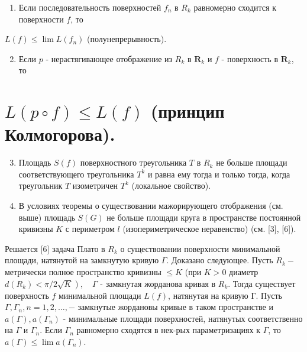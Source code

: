 \documentclass[10pt]{article}
\begin{document}
\begin{enumerate}

  \item Если последовательность поверхностей $f_{n}$ в $R_{k}$ равномерно сходится к поверхности $f$, то

\end{enumerate}



$L(f) \leqslant \lim L\left(f_{n}\right)$ (полунепрерывность).



\begin{enumerate}

  \setcounter{enumi}{1}

  \item Если $p$ - нерастягивающее отображение из $R_{k}$ в $\boldsymbol{R}_{k}$ и $f$ - поверхность в $\boldsymbol{R}_{k}$, то

\end{enumerate}



\section{$L(p \circ f) \leqslant L(f)$ (принцип Колмогорова).}

\begin{enumerate}

  \setcounter{enumi}{2}

  \item Площадь $S(f)$ поверхностного треугольника $T$ в $R_{k}$ не больше площади соответствующего треугольника $T^{k}$ и равна ему тогда и только тогда, когда треугольник $T$ изометричен $T^{k}$ (локальное свойство).



  \item В условиях теоремы о существовании мажорирующего отображения (см. выше) площадь $S(G)$ не больше площади круга в пространстве постоянной кривизны $K$ с периметром $l$ (изопериметрическое неравенство) (см. [3], [6]).



\end{enumerate}



Решается [6] задача Плато в $R_{k}$ о существовании поверхности минимальной площади, натянутой на замкнутую кривую $\Gamma$. Доказано следующее. Пусть $R_{k}-$ метрически полное пространство кривизны $\leqslant K$ (при $K>0$ диаметр $\left.d\left(R_{k}\right)<\pi / 2 \sqrt{K}\right), \quad \Gamma$ - замкнутая жорданова кривая в $R_{k}$. Тогда существует поверхность $f$ минимальной площади $L(f)$, натянутая на кривую $Г$. Пусть $\Gamma, \Gamma_{n}, n=1,2, \ldots,-$ замкнутые жордановы кривые в таком пространстве и $a(\Gamma), a\left(\Gamma_{n}\right)$ - минимальные площади поверхностей, натянутых соответственно на $\Gamma$ и $\Gamma_{n}$. Если $\Gamma_{n}$ равномерно сходятся в нек-рых параметризациях к $\Gamma$, то $a(\Gamma) \leqslant \lim a\left(\Gamma_{n}\right)$.
\end{document}
